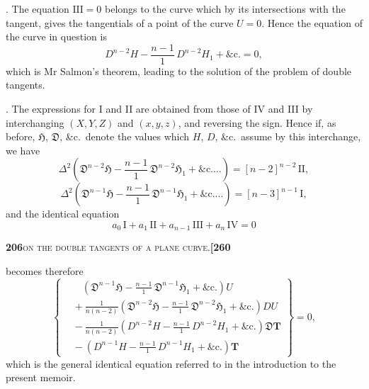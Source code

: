 \documentclass[11pt]{article}
\begin{document}
\medskip

. The equation $\mathrm{III} = 0$ belongs to the curve which by its intersections with the tangent, gives the tangentials of a point of the curve $U = 0$. Hence the equation of the curve in question is
\[
D^{n-2}H - \frac{n-1}{1}\,D^{n-2}H_1 + \&\text{c.} = 0,
\]
which is Mr Salmon's theorem, leading to the solution of the problem of double tangents.

\medskip

. The expressions for I and II are obtained from those of IV and III by interchanging $(X, Y, Z)$ and $(x, y, z)$, and reversing the sign. Hence if, as before, $\mathfrak{H}$, $\mathfrak{D}$, \&c.\ denote the values which $H$, $D$, \&c.\ assume by this interchange, we have
\[
\Delta^2\!\left(\mathfrak{D}^{n-2}\mathfrak{H} - \frac{n-1}{1}\,\mathfrak{D}^{n-2}\mathfrak{H}_1 + \&\text{c.}\ldots\right) = [n-2]^{n-2}\,\mathrm{II},
\]
\[
\Delta^2\!\left(\mathfrak{D}^{n-1}\mathfrak{H} - \frac{n-1}{1}\,\mathfrak{D}^{n-1}\mathfrak{H}_1 + \&\text{c.}\ldots\right) = [n-3]^{n-1}\,\mathrm{I},
\]
and the identical equation
\[
a_0\,\mathrm{I} + a_1\,\mathrm{II} + a_{n-1}\,\mathrm{III} + a_n\,\mathrm{IV} = 0
\]

\newpage

\noindent\textbf{206}\hfill\textsc{on the double tangents of a plane curve.}\hfill\textbf{[260}

\medskip

\noindent becomes therefore
\[
\left\{
\begin{aligned}
&\phantom{+\,}\left(\mathfrak{D}^{n-1}\mathfrak{H} - \frac{n-1}{1}\,\mathfrak{D}^{n-1}\mathfrak{H}_1 + \&\text{c.}\right)U\\[3pt]
&{}+\frac{1}{n(n-2)}\!\left(\mathfrak{D}^{n-2}\mathfrak{H} - \frac{n-1}{1}\,\mathfrak{D}^{n-2}\mathfrak{H}_1 + \&\text{c.}\right)DU\\[3pt]
&{}-\frac{1}{n(n-2)}\!\left(D^{n-2}H - \frac{n-1}{1}\,D^{n-2}H_1 + \&\text{c.}\right)\mathfrak{D}\mathbf{T}\\[3pt]
&{}-\left(D^{n-1}H - \frac{n-1}{1}\,D^{n-1}H_1 + \&\text{c.}\right)\mathbf{T}
\end{aligned}
\right\} = 0,
\]
which is the general identical equation referred to in the introduction to the present memoir.

\medskip
\end{document}
